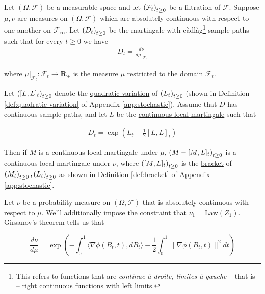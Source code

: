 \begin{theorem}
  Let $(\Omega, \mathcal{F})$ be a measurable space and let
  $\indexedabove{t}{\mathcal{F}}$ be a filtration of
  $\mathcal{F}$. Suppose $\mu,\nu$ are measures on $(\Omega,
  \mathcal{F})$ which are absolutely continuous with respect to one
  another on $\mathcal{F}_\infty$. Let $\indexedabove{t}{D}$ be the
  martingale with c\`adl\`ag\footnote{This refers to functions that
    are \emph{continue \`a droite, limites \`a gauche} -- that is --
    right continuous functions with left limits.} sample paths such
  that for every $t\geq 0$ we have
  \begin{align*}
    D_t = \frac{d\nu}{d\mu\rvert_{\mathcal{F}_t}}
  \end{align*}

  where $\mu\vert_{\mathcal{F}_t}:\mathcal{F}_t\to\mathbf{R}_+$ is the measure
  $\mu$ restricted to the domain $\mathcal{F}_t$.

  Let $\indexedabove{t}{[L,L]}$ denote the
  \hyperref[def:quadratic-variation]{quadratic variation} of
  $\indexedabove{t}{L}$ (shown in Definition \ref{def:quadratic-variation} of
  Appendix \ref{app:stochastic}).
  Assume that $D$ has continuous sample paths, and let $L$ be the
  \hyperref[def:local-martingale]{continuous local martingale} such that

  \begin{align*}
    D_t = \exp\left(L_t - \frac{1}{2}[L,L]_t\right)
  \end{align*}

  Then if $M$ is a continuous local martingale under $\mu$, $\indexedabove{t}{M -
  [M,L]}$ is a continuous local martingale under $\nu$, where
  $\indexedabove{t}{[M,L]}$ is the \hyperref[def:bracket]{bracket} of
  $\indexedabove{t}{M},\indexedabove{t}{L}$ as shown in Definition
  \ref{def:bracket} of Appendix \ref{app:stochastic}.
\end{theorem}

Let $\nu$ be a probability measure on $(\Omega, \mathcal{F})$ that is
absolutely continuous with respect to $\mu$. We'll additionally impose
the constraint that $\nu_1 = \text{Law}(Z_1)$. Girsanov's theorem
tells us that

\begin{equation}\label{eq:langevin:girsanov}
  \frac{d\nu}{d\mu} = \exp\left(-\int_0^1\langle\nabla \phi(B_t,
  t),dB_t\rangle - \frac{1}{2}\int_0^1\|\nabla \phi(B_t, t)\|^2dt\right)
\end{equation}

